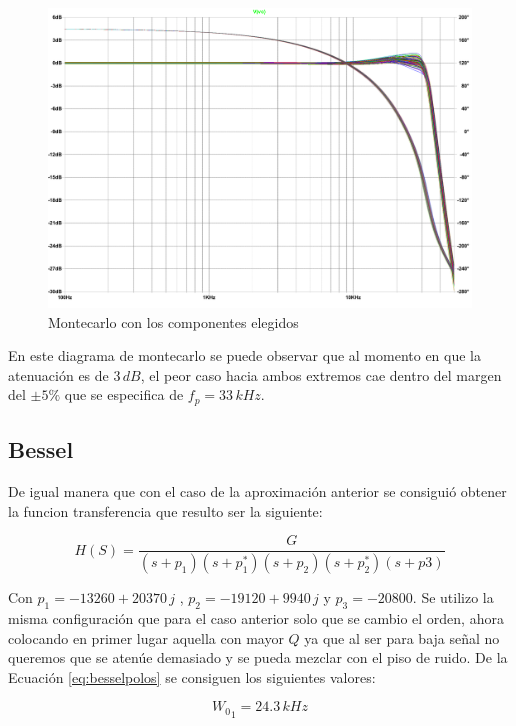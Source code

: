 \documentclass[11pt, a4paper]{article}
\begin{document}
\begin{figure}[H]
	\centering
	\includegraphics[scale=0.5]{montecarlolegendre.pdf}
	\caption{Montecarlo con los componentes elegidos}
	\label{fig:montecarlolegendre}
\end{figure}

	En este diagrama de montecarlo se puede observar que al momento en que la atenuación es de $3 \, dB$, el peor caso hacia ambos extremos cae dentro del margen del $\pm 5 \%$ que se especifica de $f_p = 33 \, kHz$.

\subsection{Bessel}
	De igual manera que con el caso de la aproximación anterior se consiguió obtener la funcion transferencia que resulto ser la siguiente:

\begin{equation}
	H(S) = \dfrac{G}{(s+p_1)(s+p_1^*)(s+p_2)(s+p_2^*)(s+p3)}
\label{eq:besselpolos}
\end{equation}

	Con $p_1 = -13260 + 20370 \, j$ , $p_2 = -19120 + 9940 \,j$ y $p_3 = -20800$.
	Se utilizo la misma configuración que para el caso anterior solo que se cambio el orden, ahora colocando en primer lugar aquella con mayor $Q$ ya que al ser para baja señal no queremos que se atenúe demasiado y se pueda mezclar con el piso de ruido.
	De la Ecuación \eqref{eq:besselpolos} se consiguen los siguientes valores:

\begin{equation}
	{W_0}_1 = 24.3 \, kHz
\label{eq:wo1Bessel}
\end{equation}
\end{document}
